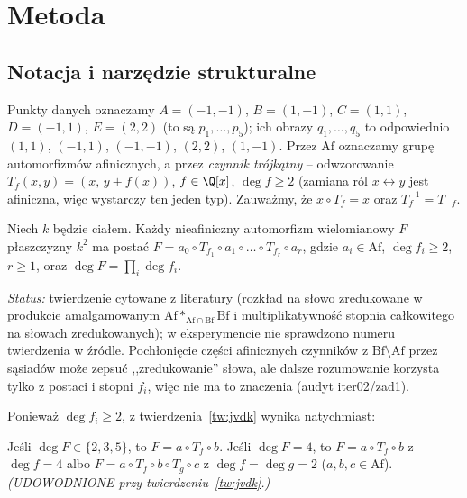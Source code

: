 \section{Metoda}

\subsection{Notacja i narzędzie strukturalne}
Punkty danych oznaczamy $A=(-1,-1)$, $B=(1,-1)$, $C=(1,1)$, $D=(-1,1)$, $E=(2,2)$ (to są
$p_1,\dots,p_5$); ich obrazy $q_1,\dots,q_5$ to odpowiednio $(1,1)$, $(-1,1)$, $(-1,-1)$, $(2,2)$,
$(1,-1)$. Przez $\mathrm{Af}$ oznaczamy grupę automorfizmów afinicznych, a przez
\emph{czynnik trójkątny} -- odwzorowanie $T_f(x,y)=(x,\,y+f(x))$, $f\in\Q[x]$, $\deg f\ge 2$
(zamiana ról $x\leftrightarrow y$ jest afiniczna, więc wystarczy ten jeden typ). Zauważmy, że
$x\circ T_f=x$ oraz $T_f^{-1}=T_{-f}$.

\begin{twierdzenie}\label{tw:jvdk}
Niech $k$ będzie ciałem. Każdy nieafiniczny automorfizm wielomianowy $F$ płaszczyzny $k^2$ ma postać
$F=a_0\circ T_{f_1}\circ a_1\circ\dots\circ T_{f_r}\circ a_r$, gdzie $a_i\in\mathrm{Af}$,
$\deg f_i\ge2$, $r\ge1$, oraz $\deg F=\prod_{i}\deg f_i$.
\end{twierdzenie}
\noindent\emph{Status:} twierdzenie cytowane z literatury
\cite{Jung,vdKulk,FriedlandMilnor,vdEssen} (rozkład na słowo zredukowane w produkcie
amalgamowanym $\mathrm{Af}*_{\mathrm{Af}\cap\mathrm{Bf}}\mathrm{Bf}$ i multiplikatywność stopnia
całkowitego na słowach zredukowanych); w eksperymencie nie sprawdzono numeru twierdzenia w źródle.
Pochłonięcie części afinicznych czynników z $\mathrm{Bf}\setminus\mathrm{Af}$ przez sąsiadów może
zepsuć ,,zredukowanie'' słowa, ale dalsze rozumowanie korzysta tylko z postaci i stopni $f_i$,
więc nie ma to znaczenia (audyt iter02/zad1).

Ponieważ $\deg f_i\ge2$, z twierdzenia~\ref{tw:jvdk} wynika natychmiast:
\begin{stwierdzenie}\label{stw:przypadki}
Jeśli $\deg F\in\{2,3,5\}$, to $F=a\circ T_f\circ b$. Jeśli $\deg F=4$, to $F=a\circ T_f\circ b$ z
$\deg f=4$ albo $F=a\circ T_f\circ b\circ T_g\circ c$ z $\deg f=\deg g=2$
($a,b,c\in\mathrm{Af}$). \emph{(UDOWODNIONE przy twierdzeniu~\ref{tw:jvdk}.)}
\end{stwierdzenie}

